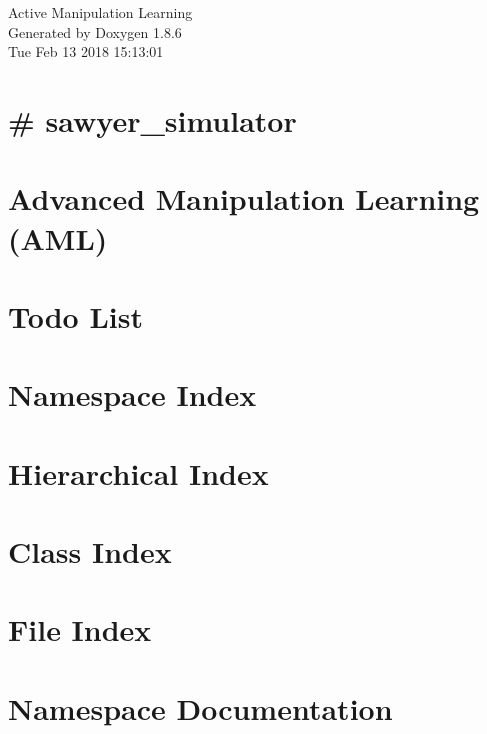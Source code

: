 \documentclass[twoside]{book}
\newcommand{\clearemptydoublepage}{%
  \newpage{\pagestyle{empty}\cleardoublepage}%
}
\begin{document}
\hypersetup{pageanchor=false}
\begin{titlepage}
\vspace*{7cm}
\begin{center}%
{\Large Active Manipulation Learning }\\
\vspace*{1cm}
{\large Generated by Doxygen 1.8.6}\\
\vspace*{0.5cm}
{\small Tue Feb 13 2018 15:13:01}\\
\end{center}
\end{titlepage}
\clearemptydoublepage
\tableofcontents
\clearemptydoublepage
{}
\hypersetup{pageanchor=true}

\chapter{\# sawyer\-\_\-simulator}
\label{md_aml_sawyer_sim__r_e_a_d_m_e}
\hypertarget{md_aml_sawyer_sim__r_e_a_d_m_e}{}

\chapter{Advanced Manipulation Learning (A\-M\-L)}
\label{md__r_e_a_d_m_e}
\hypertarget{md__r_e_a_d_m_e}{}

\chapter{Todo List}
\label{todo}
\hypertarget{todo}{}

\chapter{Namespace Index}

\chapter{Hierarchical Index}

\chapter{Class Index}

\chapter{File Index}

\chapter{Namespace Documentation}




\end{document}
